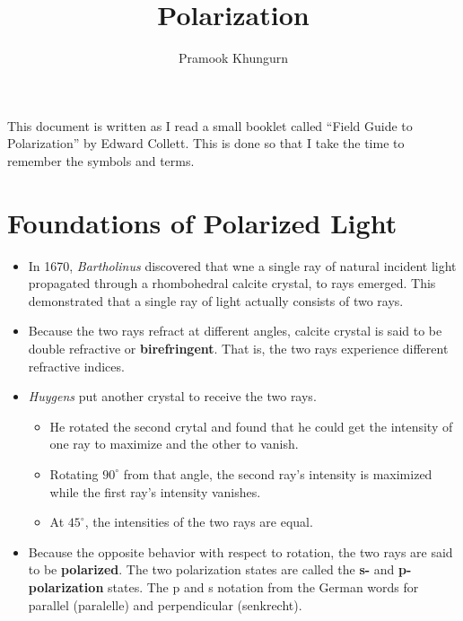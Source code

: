 \documentclass[10pt]{article}
\title{Polarization}
\author{Pramook Khungurn}
\begin{document}
	\maketitle

	This document is written as I read a small booklet called ``Field Guide to Polarization'' by Edward Collett.  This is done so that I take the time to remember the symbols and terms.

	\section{Foundations of Polarized Light}

	\begin{itemize}
		\item In 1670, \emph{Bartholinus} discovered that wne a single ray of natural incident light propagated through a rhombohedral calcite crystal, to rays emerged.  This demonstrated that a single ray of light actually consists of two rays.

		\item Because the two rays refract at different angles, calcite crystal is said to be double refractive or \textbf{birefringent}.  That is, the two rays experience different refractive indices.

		\item \emph{Huygens} put another crystal to receive the two rays.
		\begin{itemize}
		 	\item He rotated the second crytal and found that he could get the intensity of one ray to maximize and the other to vanish.
		 	\item Rotating $90^\circ$ from that angle, the second ray's intensity is maximized while the first ray's intensity vanishes.  
		 	\item At $45^\circ$, the intensities of the two rays are equal.
		\end{itemize} 

		\item Because the opposite behavior with respect to rotation, the two rays are said to be \textbf{polarized}.  The two polarization states are called the \textbf{s-} and \textbf{p-polarization} states.  The p and s notation from the German words for parallel (paralelle) and perpendicular (senkrecht).


\end{itemize}
\end{document}
